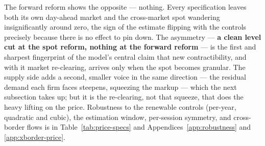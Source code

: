 \documentclass[11pt,a4paper]{article}
\theoremstyle{definition}
\theoremstyle{remark}
\theoremstyle{plain}
\begin{document}
The forward reform shows the opposite --- nothing. Every specification leaves both its own day-ahead market and the cross-market spot wandering insignificantly around zero, the sign of the estimate flipping with the controls precisely because there is no effect to pin down. The asymmetry --- \textbf{a clean level cut at the spot reform, nothing at the forward reform} --- is the first and sharpest fingerprint of the model's central claim that new contractibility, and with it market re-clearing, arrives only when the spot becomes granular. The supply side adds a second, smaller voice in the same direction --- the residual demand each firm faces steepens, squeezing the markup --- which the next subsection takes up; but it is the re-clearing, not that squeeze, that does the heavy lifting on the price.
Robustness to the renewable controls (per-year, quadratic and cubic), the estimation window, per-session symmetry, and cross-border flows is in Table~\ref{tab:price-specs} and Appendices~\ref{app:robustness} and \ref{app:xborder-price}.
\end{document}
